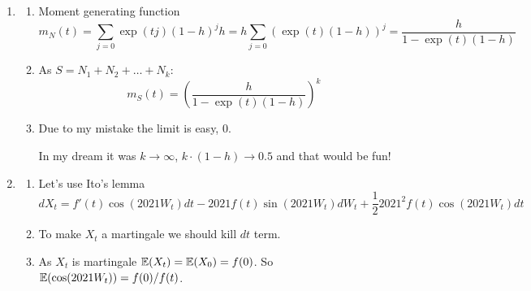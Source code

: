 \begin{enumerate}
\begin{enumerate}
    Using all available information we obtain $u_{100}  = 1.5$ and hence
    \[
    y_{101} \mid x \sim  \cN(1 + 0.5 y_{99} + u_{100} ; 4)
    \]

    \item Here we work with true betas:
    \[
    \E(y_{101} \mid y_{100}) = \mu_y + \frac{\Cov(y_{100}, y_{101})}{\Var(y_{100})}(y_{100} - \mu_y)    
    \]

\end{enumerate}
\item \begin{enumerate}
    \item Moment generating function
\[
m_N(t) = \sum_{j=0} \exp(tj) (1-h)^j h = h \sum_{j=0} (\exp(t) (1-h))^j = \frac{h}{1 - \exp(t) (1 - h)}  
\]
\item As $S = N_1 + N_2 + \ldots + N_k$:
\[
m_S(t) =  \left( \frac{h}{1 - \exp(t) (1 - h)} \right)^k
\]
\item Due to my mistake the limit is easy, $0$. 

In my dream it was $k\to \infty$, $k \cdot (1 - h) \to 0.5$ and that would be fun!

\end{enumerate}

\item \begin{enumerate}
    \item Let's use Ito's lemma
    \[
    dX_t = f'(t) \cos (2021 W_t) dt - 2021 f(t) \sin (2021 W_t) dW_t + \frac{1}{2}2021^2 f(t) \cos(2021 W_t) dt    
    \]
    \item To make $X_t$ a martingale we should kill $dt$ term. 
    \item As $X_t$ is martingale $\operatorname{\mathbb{E}}(X_t) = \operatorname{\mathbb{E}}(X_0) = f(0)$.
    So $\operatorname{\mathbb{E}}(\cos (2021 W_t)) = f(0) / f(t)$.
\end{enumerate}

\end{enumerate}



